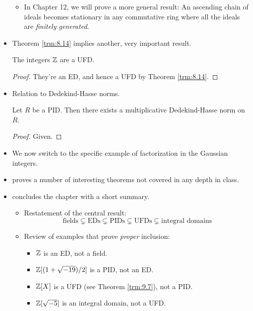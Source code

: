 \documentclass[../notes.tex]{subfiles}
\begin{document}
\begin{itemize}
    \begin{itemize}
        \item In Chapter 12, we will prove a more general result: An ascending chain of ideals becomes stationary in any commutative ring where all the ideals are \emph{finitely generated}.
    \end{itemize}
    \item Theorem \ref{trm:8.14} implies another, very important result.
    \begin{corollary}\label{cly:8.15}
        The integers $\mathbb{Z}$ are a UFD.
        \begin{proof}
            They're an ED, and hence a UFD by Theorem \ref{trm:8.14}.
        \end{proof}
    \end{corollary}
    \item Relation to Dedekind-Hasse norms.
    \begin{corollary}\label{cly:8.16}
        Let $R$ be a PID. Then there exists a multiplicative Dedekind-Hasse norm on $R$.
        \begin{proof}
            Given.
        \end{proof}
    \end{corollary}
    \item We now switch to the specific example of factorization in the Gaussian integers.
    \item \textcite{bib:DummitFoote} proves a number of interesting theorems not covered in any depth in class.
    \item \textcite{bib:DummitFoote} concludes the chapter with a short summary.
    \begin{itemize}
        \item Restatement of the central result:
        \begin{equation*}
            \text{fields} \subsetneq \text{EDs}
            \subsetneq \text{PIDs}
            \subsetneq \text{UFDs}
            \subsetneq \text{integral domains}
        \end{equation*}
        \item Review of examples that prove \emph{proper} inclusion:
        \begin{itemize}
            \item $\mathbb{Z}$ is an ED, not a field.
            \item $\mathbb{Z}[(1+\sqrt{-19})/2]$ is a PID, not an ED.
            \item $\mathbb{Z}[X]$ is a UFD (see Theorem \ref{trm:9.7}), not a PID.
            \item $\mathbb{Z}[\sqrt{-5}]$ is an integral domain, not a UFD.
        \end{itemize}
    \end{itemize}
\end{itemize}
\end{document}
